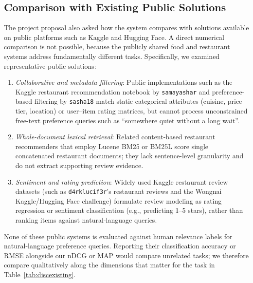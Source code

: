 \subsection{Comparison with Existing Public Solutions}
\label{sec:discexisting}

The project proposal also asked how the system compares with solutions available on public platforms such as Kaggle and Hugging Face. A direct numerical comparison is not possible, because the publicly shared food and restaurant systems address fundamentally different tasks. Specifically, we examined representative public solutions:
\begin{enumerate}[label=(\alph*)]
    \item \emph{Collaborative and metadata filtering}: Public implementations such as the Kaggle restaurant recommendation notebook by \texttt{samayashar} and preference-based filtering by \texttt{sasha18} match static categorical attributes (cuisine, price tier, location) or user--item rating matrices, but cannot process unconstrained free-text preference queries such as ``somewhere quiet without a long wait''.
    \item \emph{Whole-document lexical retrieval}: Related content-based restaurant recommenders that employ Lucene BM25 or BM25L score single concatenated restaurant documents; they lack sentence-level granularity and do not extract supporting review evidence.
    \item \emph{Sentiment and rating prediction}: Widely used Kaggle restaurant review datasets (such as \texttt{d4rklucif3r}'s restaurant reviews and the Wongnai Kaggle/Hugging Face challenge) formulate review modeling as rating regression or sentiment classification (e.g., predicting 1--5 stars), rather than ranking items against natural-language queries.
\end{enumerate}
None of these public systems is evaluated against human relevance labels for natural-language preference queries. Reporting their classification accuracy or RMSE alongside our nDCG or MAP would compare unrelated tasks; we therefore compare qualitatively along the dimensions that matter for the task in Table~\ref{tab:discexisting}.

